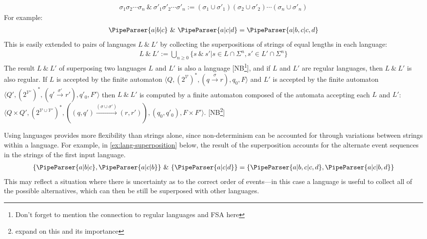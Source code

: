 \documentclass[a4paper,12pt,leqno]{article}
\newcommand{\vph}[1]{\vphantom{#1}}
\newcommand{\sta}[2]{\stackrel{#1}{#2}}
\newcommand{\ebox}[1]{\fbox{$\vph{'(),}#1$}}
\renewcommand{\sp}{~\&~}
\newcommand{\EventString}[1]{
	\renewcommand*{\do}[1]{\ebox{##1}}%
	\PipeParser{#1}
}
\newcommand{\selfnote}[1]{{\color{red}[NB\footnote{{\color{red}#1}}]}}
\newcommand{\nb}{\selfnote}
\begin{document}
\begin{align}\label{def:superposition}
	\sigma_1\sigma_2\cdots\sigma_n \sp \sigma'_1\sigma'_2\cdots\sigma'_n := (\sigma_1 \cup \sigma'_1)(\sigma_2 \cup \sigma'_2)\cdots(\sigma_n \cup \sigma'_n)
\end{align}
For example:
\begin{align}\label{ex:superposition}
	\EventString{a|b|c} \sp{} \EventString{a|c|d} = \EventString{a|b,c|c,d}
\end{align}
This is easily extended to pairs of languages $L \sp L'$ by collecting the superpositions of strings of equal lengths in each language:
\begin{align}\label{def:lang-superposition}
	L \sp L' := \bigcup_{n \ge 0}\{ s \sp s' | s \in L \cap \Sigma^n, s' \in L' \cap \Sigma^n\}
\end{align}
The result $L \sp L'$ of superposing two languages $L$ and $L'$ is also a language \nb{Don't forget to mention the connection to regular languages and FSA here}, and if $L$ and $L'$ are regular languages, then $L \sp L'$ is also regular. If $L$ is accepted by the finite automaton $\langle Q, (2^\mathcal{V})^*, (q \sta{\sigma}{\to} r), q_0, F \rangle$ and $L'$ is accepted by the finite automaton $\langle Q', (2^{\mathcal{V}'})^*, (q' \sta{\sigma'}{\to} r'), q'_0, F' \rangle$ then $L \sp L'$ is computed by a finite automaton composed of the automata accepting each $L$ and $L'$: $\langle Q \times Q', (2^{\mathcal{V} \cup \mathcal{V}'})^*, ((q, q') \sta{(\sigma \cup \sigma')}{\to} (r, r')), (q_0, q'_0), F \times F' \rangle$. \nb{expand on this and its importance}

Using languages provides more flexibility than strings alone, since non-determinism can be accounted for through variations between strings within a language. For example, in \cref{ex:lang-superposition} below, the result of the superposition accounts for the alternate event sequences in the strings of the first input language.
\begin{align}\label{ex:lang-superposition}
	\{\EventString{a|b|c}, \EventString{a|c|b}\} \sp \{\EventString{a|c|d}\} = \{\EventString{a|b,c|c,d}, \EventString{a|c|b,d}\}
\end{align}
This may reflect a situation where there is uncertainty as to the correct order of events---in this case a language is useful to collect all of the possible alternatives, which can then be still be superposed with other languages. 
\end{document}
